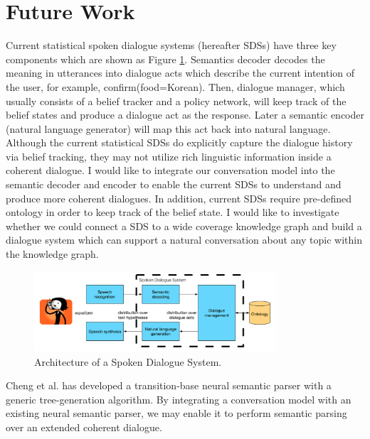 \documentclass[bsc,frontabs,twoside,singlespacing,parskip,deptreport]{infthesis}     %
\begin{document}
\section{Future Work}

Current statistical spoken dialogue systems (hereafter SDSs) have three key components which are shown as Figure \ref{fig:sds}. Semantics decoder decodes the meaning in utterances into dialogue acts which describe the current intention of the user, for example, confirm(food=Korean). Then, dialogue manager, which usually consists of a belief tracker and a policy network, will keep track of the belief states and produce a dialogue act as the response. Later a semantic encoder (natural language generator) will map this act back into natural language. Although the current statistical SDSs do explicitly capture the dialogue history via belief tracking, they may not utilize rich linguistic information inside a coherent dialogue. I would like to integrate our conversation model into the semantic decoder and encoder to enable the current SDSs to understand and produce more coherent dialogues. In addition, current SDSs require pre-defined ontology in order to keep track of the belief state. I would like to investigate whether we could connect a SDS to a wide coverage knowledge graph and build a dialogue system which can support a natural conversation about any topic within the knowledge graph.

\begin{figure}[h]
    \centering
    \includegraphics[width=0.80\textwidth]{sds.png}
    \caption{Architecture of a Spoken Dialogue System.\cite{gasic}}
    \label{fig:sds}
\end{figure}

Cheng et al.\cite{cheng2019learning} has developed a transition-base neural semantic parser with a generic tree-generation algorithm. By integrating a conversation model with an existing neural semantic parser, we may enable it to perform semantic parsing over an extended coherent dialogue.



\end{document}
